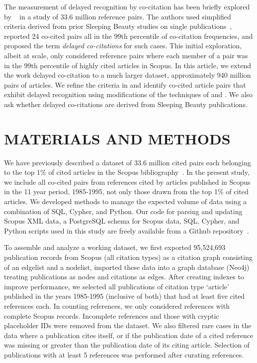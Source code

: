 \documentclass[utf8]{frontiersSCNS}
\begin{document}
The measurement of delayed recognition by co-citation has been briefly explored by ~\cite{devarakonda_2020} in a study of 33.6 million reference pairs. The authors used simplified criteria derived from prior Sleeping Beauty studies on single publications~\citep{Ke2015,Raan2004,Raan2019}, reported 24 co-cited pairs all in the 99th percentile of co-citation frequencies, and proposed the term \emph{delayed co-citations} for such cases. This initial exploration, albeit at scale, only considered reference pairs where each member of a pair was in the 99th percentile of highly cited articles in Scopus.  
In this article, we extend the work delayed co-citation to a much larger dataset, approximately 940 million pairs of articles. We refine the criteria in \cite{devarakonda_2020} and identify co-cited article pairs that exhibit delayed recognition using modifications of 
the techniques of \cite{Raan2004,Raan2019} and  \cite{Ke2015}.  We also ask whether delayed co-citations are derived from Sleeping Beauty publications. 

\section{MATERIALS AND METHODS}

We have previously described a dataset of 33.6 million cited pairs each belonging to the top 1\% of cited articles in the Scopus bibliography~\citep[Figure~2]{devarakonda_2020}. In the present study, we include all co-cited pairs from references cited by articles published in Scopus in the 11 year period, 1985-1995, not only those drawn from the top 1\% of cited articles. We developed methods to manage the expected volume of data using a combination of SQL, Cypher, and Python. Our code for parsing and updating Scopus XML data, a PostgreSQL schema for Scopus data, SQL, Cypher, and Python scripts used in this study are freely available from a Github repository~\citep{Korobskiy2019}.

To assemble and analyze a working dataset, we first exported 95,524,693 publication records from Scopus (all citation types) as a citation graph consisting of an edgelist and a nodelist, imported these data into a graph database (Neo4j) treating publications as nodes and citations as edges. After creating indexes to improve performance, we selected all publications of citation type `article' published in the years 1985-1995 (inclusive of both) that had at least five cited references each. In counting references, we only considered references with complete Scopus records. Incomplete references and those with cryptic placeholder IDs were removed from the dataset. We also filtered rare cases in the data where a publication cites itself, or if the publication date of a cited reference was missing or greater than the publication date of its citing article. Selection of publications with at least 5 references was performed after curating references.
\end{document}
